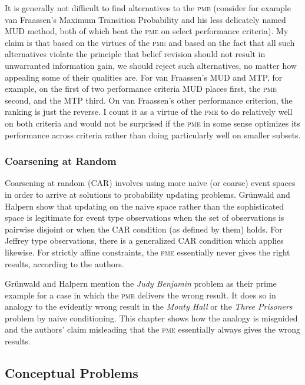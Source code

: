 \documentclass[11pt]{article}
\begin{document}
It is generally not difficult to find alternatives to the \textsc{pme}
(consider for example van Fraassen's Maximum Transition Probability
and his less delicately named MUD method, both of which beat the
\textsc{pme} on select performance criteria). My claim is that based
on the virtues of the \textsc{pme} and based on the fact that all such
alternatives violate the principle that belief revision should not
result in unwarranted information gain, we should reject such
alternatives, no matter how appealing some of their qualities are. For
van Fraassen's MUD and MTP, for example, on the first of two
performance criteria MUD places first, the \textsc{pme} second, and
the MTP third. On van Fraassen's other performance criterion, the
ranking is just the reverse. I count it as a virtue of the
\textsc{pme} to do relatively well on both criteria and would not be
surprised if the \textsc{pme} in some sense optimizes its performance
across criteria rather than doing particularly well on smaller
subsets.

\subsubsection{Coarsening at Random}
\label{CoarseningAtRandom}

Coarsening at random (\textsc{CAR}) involves using more naive (or
coarse) event spaces in order to arrive at solutions to probability
updating problems. Gr{\"u}nwald and Halpern show that updating on the
naive space rather than the sophisticated space is legitimate for
event type observations when the set of observations is pairwise
disjoint or when the \textsc{CAR} condition (as defined by them)
holds. For Jeffrey type observations, there is a generalized
\textsc{CAR} condition which applies likewise. For strictly affine
constraints, the \textsc{pme} essentially never gives the right
results, according to the authors.

Gr{\"u}nwald and Halpern mention the \emph{Judy Benjamin} problem as
their prime example for a case in which the \textsc{pme} delivers the
wrong result. It does so in analogy to the evidently wrong result in
the \emph{Monty Hall} or the \emph{Three Prisoners} problem by naive
conditioning. This chapter shows how the analogy is misguided and the
authors' claim misleading that the \textsc{pme} essentially always
gives the wrong results.

\subsection{Conceptual Problems}
\label{ConceptualProblems}
\end{document}
